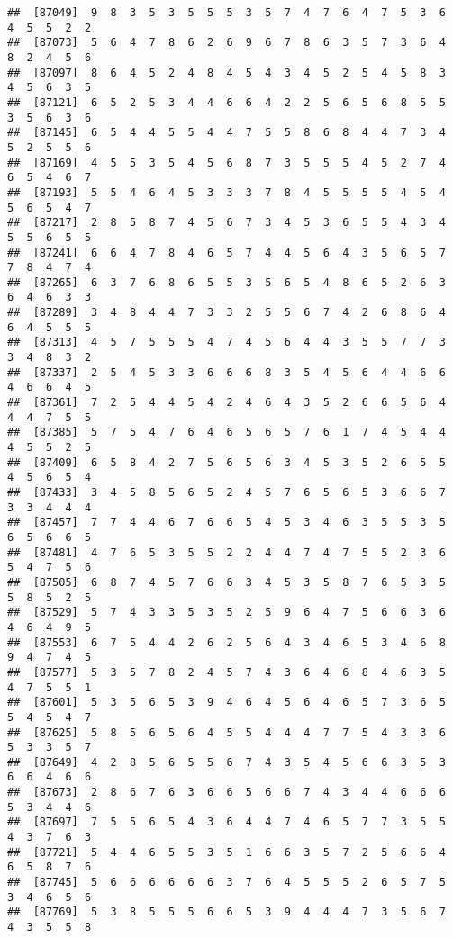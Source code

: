 \documentclass[
]{book}
\begin{document}
\begin{verbatim}
##  [87049]  9  8  3  5  3  5  5  5  3  5  7  4  7  6  4  7  5  3  6  4  5  5  2  2
##  [87073]  5  6  4  7  8  6  2  6  9  6  7  8  6  3  5  7  3  6  4  8  2  4  5  6
##  [87097]  8  6  4  5  2  4  8  4  5  4  3  4  5  2  5  4  5  8  3  4  5  6  3  5
##  [87121]  6  5  2  5  3  4  4  6  6  4  2  2  5  6  5  6  8  5  5  3  5  6  3  6
##  [87145]  6  5  4  4  5  5  4  4  7  5  5  8  6  8  4  4  7  3  4  5  2  5  5  6
##  [87169]  4  5  5  3  5  4  5  6  8  7  3  5  5  5  4  5  2  7  4  6  5  4  6  7
##  [87193]  5  5  4  6  4  5  3  3  3  7  8  4  5  5  5  5  4  5  4  5  6  5  4  7
##  [87217]  2  8  5  8  7  4  5  6  7  3  4  5  3  6  5  5  4  3  4  5  5  6  5  5
##  [87241]  6  6  4  7  8  4  6  5  7  4  4  5  6  4  3  5  6  5  7  7  8  4  7  4
##  [87265]  6  3  7  6  8  6  5  5  3  5  6  5  4  8  6  5  2  6  3  6  4  6  3  3
##  [87289]  3  4  8  4  4  7  3  3  2  5  5  6  7  4  2  6  8  6  4  6  4  5  5  5
##  [87313]  4  5  7  5  5  5  4  7  4  5  6  4  4  3  5  5  7  7  3  3  4  8  3  2
##  [87337]  2  5  4  5  3  3  6  6  6  8  3  5  4  5  6  4  4  6  6  4  6  6  4  5
##  [87361]  7  2  5  4  4  5  4  2  4  6  4  3  5  2  6  6  5  6  4  4  4  7  5  5
##  [87385]  5  7  5  4  7  6  4  6  5  6  5  7  6  1  7  4  5  4  4  4  5  5  2  5
##  [87409]  6  5  8  4  2  7  5  6  5  6  3  4  5  3  5  2  6  5  5  4  5  6  5  4
##  [87433]  3  4  5  8  5  6  5  2  4  5  7  6  5  6  5  3  6  6  7  3  3  4  4  4
##  [87457]  7  7  4  4  6  7  6  6  5  4  5  3  4  6  3  5  5  3  5  6  5  6  6  5
##  [87481]  4  7  6  5  3  5  5  2  2  4  4  7  4  7  5  5  2  3  6  5  4  7  5  6
##  [87505]  6  8  7  4  5  7  6  6  3  4  5  3  5  8  7  6  5  3  5  5  8  5  2  5
##  [87529]  5  7  4  3  3  5  3  5  2  5  9  6  4  7  5  6  6  3  6  4  6  4  9  5
##  [87553]  6  7  5  4  4  2  6  2  5  6  4  3  4  6  5  3  4  6  8  9  4  7  4  5
##  [87577]  5  3  5  7  8  2  4  5  7  4  3  6  4  6  8  4  6  3  5  4  7  5  5  1
##  [87601]  5  3  5  6  5  3  9  4  6  4  5  6  4  6  5  7  3  6  5  5  4  5  4  7
##  [87625]  5  8  5  6  5  6  4  5  5  4  4  4  7  7  5  4  3  3  6  5  3  3  5  7
##  [87649]  4  2  8  5  6  5  5  6  7  4  3  5  4  5  6  6  3  5  3  6  6  4  6  6
##  [87673]  2  8  6  7  6  3  6  6  5  6  6  7  4  3  4  4  6  6  6  5  3  4  4  6
##  [87697]  7  5  5  6  5  4  3  6  4  4  7  4  6  5  7  7  3  5  5  4  3  7  6  3
##  [87721]  5  4  4  6  5  5  3  5  1  6  6  3  5  7  2  5  6  6  4  6  5  8  7  6
##  [87745]  5  6  6  6  6  6  6  3  7  6  4  5  5  5  2  6  5  7  5  3  4  6  5  6
##  [87769]  5  3  8  5  5  5  6  6  5  3  9  4  4  4  7  3  5  6  7  4  3  5  5  8

\end{verbatim}
\end{document}

